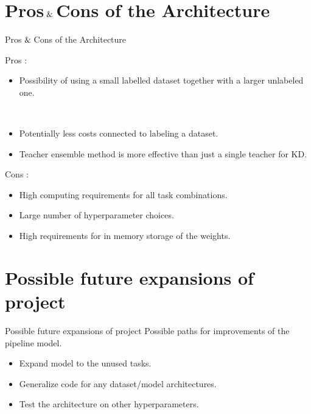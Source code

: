 \documentclass [xcolor=svgnames, t] {beamer}
\begin{document}
\section{Pros$\And$Cons of the Architecture}
\begin{frame}{Pros$\And$Cons of the Architecture}
    \begin{multicols}{2}
    Pros :
    \begin{itemize}
    \vspace{14}
        \item  Possibility of using a small labelled dataset together with a larger unlabeled one.
        

        \\
        \item Potentially less costs connected to labeling a dataset.
        \\
        
        \item Teacher ensemble method is more effective than just a single teacher for KD.
    \end{itemize}
    \columnbreak
    Cons :
    \begin{itemize}
        \item High computing requirements for all task combinations. 
        \item Large number of hyperparameter choices.
        \item High requirements for in memory storage of the weights.
    \end{itemize}
    \end{multicols}
    
    \centering
\end{frame}

\section{Possible future expansions of project}
\begin{frame}{Possible future expansions of project}
\vspace{3mm}
Possible paths for improvements of the pipeline model.
\vspace{2mm}
   \begin{itemize}
        \item Expand model to the unused tasks.
       \item Generalize code for any dataset/model architectures.
       \item Test the architecture on other hyperparameters.
   \end{itemize}
\end{frame}
\end{document}
